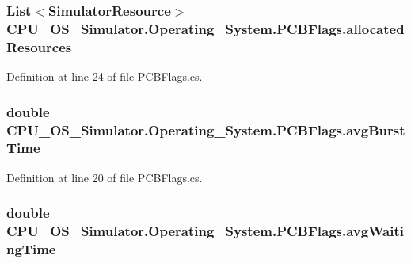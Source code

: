 \subsubsection[{allocated\+Resources}]{\setlength{\rightskip}{0pt plus 5cm}List$<${\bf Simulator\+Resource}$>$ C\+P\+U\+\_\+\+O\+S\+\_\+\+Simulator.\+Operating\+\_\+\+System.\+P\+C\+B\+Flags.\+allocated\+Resources}\label{struct_c_p_u___o_s___simulator_1_1_operating___system_1_1_p_c_b_flags_a2ba3b061d4ea3ab2da4520a2c4333229}


Definition at line 24 of file P\+C\+B\+Flags.\+cs.

\hypertarget{struct_c_p_u___o_s___simulator_1_1_operating___system_1_1_p_c_b_flags_a1c7b8ae576214d5e26c37727b15b8833}{}
\subsubsection[{avg\+Burst\+Time}]{\setlength{\rightskip}{0pt plus 5cm}double C\+P\+U\+\_\+\+O\+S\+\_\+\+Simulator.\+Operating\+\_\+\+System.\+P\+C\+B\+Flags.\+avg\+Burst\+Time}\label{struct_c_p_u___o_s___simulator_1_1_operating___system_1_1_p_c_b_flags_a1c7b8ae576214d5e26c37727b15b8833}


Definition at line 20 of file P\+C\+B\+Flags.\+cs.

\hypertarget{struct_c_p_u___o_s___simulator_1_1_operating___system_1_1_p_c_b_flags_ae6d30d555620b4fe5a92baea4ad933d1}{}
\subsubsection[{avg\+Waiting\+Time}]{\setlength{\rightskip}{0pt plus 5cm}double C\+P\+U\+\_\+\+O\+S\+\_\+\+Simulator.\+Operating\+\_\+\+System.\+P\+C\+B\+Flags.\+avg\+Waiting\+Time}\label{struct_c_p_u___o_s___simulator_1_1_operating___system_1_1_p_c_b_flags_ae6d30d555620b4fe5a92baea4ad933d1}


